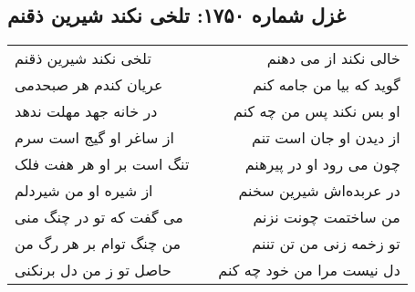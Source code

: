 \begin{center}
\section*{غزل شماره ۱۷۵۰: تلخی نکند شیرین ذقنم}
\label{sec:1750}
\begin{longtable}{l p{0.5cm} r}
تلخی نکند شیرین ذقنم
&&
خالی نکند از می دهنم
\\
عریان کندم هر صبحدمی
&&
گوید که بیا من جامه کنم
\\
در خانه جهد مهلت ندهد
&&
او بس نکند پس من چه کنم
\\
از ساغر او گیج است سرم
&&
از دیدن او جان است تنم
\\
تنگ است بر او هر هفت فلک
&&
چون می رود او در پیرهنم
\\
از شیره او من شیردلم
&&
در عربده‌اش شیرین سخنم
\\
می گفت که تو در چنگ منی
&&
من ساختمت چونت نزنم
\\
من چنگ توام بر هر رگ من
&&
تو زخمه زنی من تن تننم
\\
حاصل تو ز من دل برنکنی
&&
دل نیست مرا من خود چه کنم
\\
\end{longtable}
\end{center}

